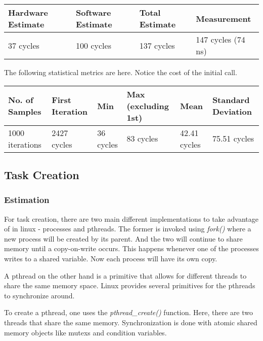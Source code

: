 \documentclass[paper=a4, fontsize=11pt]{scrartcl}
\numberwithin{equation}{section}        %
\numberwithin{figure}{section}          %
\numberwithin{table}{section}               %
\begin{document}
\begin{center}
    \begin{tabular}{ | l | l | l | l |}
    \hline
    Hardware Estimate & Software Estimate & Total Estimate & Measurement \\ \hline
    37 cycles & 100 cycles & 137 cycles & 147 cycles (74 ns) \\ 
    \hline
    \end{tabular}
\end{center}

The following statistical metrics are here.  Notice the cost of the initial call.

\begin{center}
    \begin{tabular}{ | l | l | l | l | l | l |}
    \hline
    No. of Samples & First Iteration & Min & Max (excluding 1st) & Mean & Standard Deviation \\ \hline
    1000 iterations & 2427 cycles & 36 cycles & 83 cycles & 42.41 cycles & 75.51 cycles \\ 
    \hline
    \end{tabular}
\end{center}


\subsection{Task Creation}

\subsubsection{Estimation}

For task creation, there are two main different implementations to take advantage of in linux - processes and pthreads.  The former is invoked using \textit{fork()} where a new process will be created by its parent.  And the two will continue to share memory until a copy-on-write occurs.  This happens whenever one of the processes writes to a shared variable.  Now each process will have its own copy.

A pthread on the other hand is a primitive that allows for different threads to share the same memory space.  Linux provides several primitives for the pthreads to synchronize around.

To create a pthread, one uses the \textit{pthread\_create()} function.  Here, there are two threads that share the same memory.  Synchronization is done with atomic shared memory objects like mutexs and condition variables.
\end{document}
